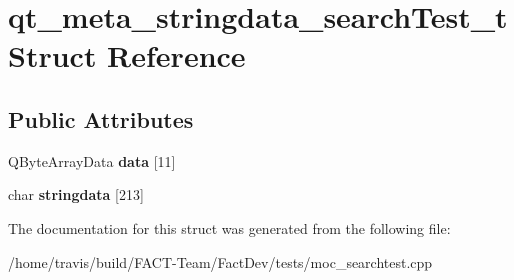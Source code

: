 \hypertarget{structqt__meta__stringdata__searchTest__t}{\section{qt\-\_\-meta\-\_\-stringdata\-\_\-search\-Test\-\_\-t Struct Reference}
\label{structqt__meta__stringdata__searchTest__t}
}
\subsection*{Public Attributes}
\begin{DoxyCompactItemize}
\item 
\hypertarget{structqt__meta__stringdata__searchTest__t_a7dbda12d69b43982ea1314384fdd044f}{Q\-Byte\-Array\-Data {\bfseries data} \mbox{[}11\mbox{]}}\label{structqt__meta__stringdata__searchTest__t_a7dbda12d69b43982ea1314384fdd044f}

\item 
\hypertarget{structqt__meta__stringdata__searchTest__t_a618bef069ca8a04c20822d890eef8cf7}{char {\bfseries stringdata} \mbox{[}213\mbox{]}}\label{structqt__meta__stringdata__searchTest__t_a618bef069ca8a04c20822d890eef8cf7}

\end{DoxyCompactItemize}


The documentation for this struct was generated from the following file\-:\begin{DoxyCompactItemize}
\item 
/home/travis/build/\-F\-A\-C\-T-\/\-Team/\-Fact\-Dev/tests/moc\-\_\-searchtest.\-cpp\end{DoxyCompactItemize}
